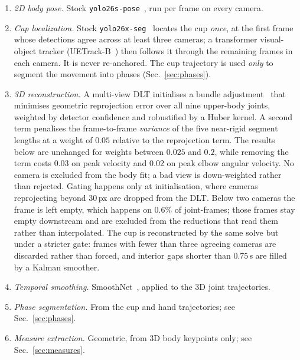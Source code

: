 \documentclass[conference]{IEEEtran}
\begin{document}
\begin{enumerate}
  \item \emph{2D body pose.} Stock \texttt{yolo26s-pose}~\cite{yolo26}, run per frame on
        every camera.
  \item \emph{Cup localization.} Stock \texttt{yolo26x-seg}~\cite{yolo26} locates the cup
        \emph{once}, at the first frame whose detections agree across at least
        three cameras; a transformer visual-object tracker
        (UETrack-B~\cite{uetrack}) then
        follows it through the remaining frames in each camera. It is never
        re-anchored. The cup trajectory is used \emph{only} to segment the
        movement into phases (Sec.~\ref{sec:phases}).
  \item \emph{3D reconstruction.} A multi-view DLT initialises a bundle
        adjustment~\cite{hartley2004} that minimises geometric reprojection error
        over all nine upper-body joints, weighted by detector confidence and
        robustified by a Huber kernel. A second term penalises the
        frame-to-frame \emph{variance} of the five near-rigid segment lengths at
        a weight of $0.05$ relative to the reprojection term. The results below
        are unchanged for weights between $0.025$
        and $0.2$, while removing the term costs $0.03$ on peak velocity and
        $0.02$ on peak elbow angular velocity. No
        camera is excluded from the body fit; a bad view is down-weighted rather
        than rejected. Gating happens only at initialisation, where cameras
        reprojecting beyond $30$\,px are dropped from the DLT. Below two cameras the frame
        is left empty, which happens on $0.6\%$ of joint-frames; those frames
        stay empty downstream and are excluded from the reductions that read
        them rather than interpolated. The cup is
        reconstructed by the same solve but under a stricter gate: frames with
        fewer than three agreeing cameras are discarded rather than forced, and
        interior gaps shorter than $0.75$\,s are filled by a Kalman smoother.

  \item \emph{Temporal smoothing.} SmoothNet~\cite{smoothnet}, applied to the 3D
        joint trajectories.
  \item \emph{Phase segmentation.} From the cup and hand trajectories; see
        Sec.~\ref{sec:phases}.
  \item \emph{Measure extraction.} Geometric, from 3D body keypoints only; see
        Sec.~\ref{sec:measures}.
\end{enumerate}
\end{document}
